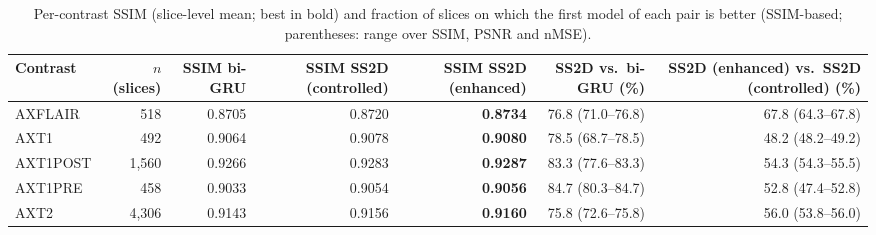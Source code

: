 \begin{table}[ht]
\centering
\caption{Per-contrast SSIM (slice-level mean; best in bold) and fraction of slices on which the first model of each pair is better (SSIM-based; parentheses: range over SSIM, PSNR and nMSE).}
\label{tab:contrast-slice}
\begin{tabular}{lrrrrrr}
\toprule
Contrast & $n$ (slices) & SSIM bi-GRU & SSIM SS2D (controlled) & SSIM SS2D (enhanced) & SS2D vs.\ bi-GRU (\%) & SS2D (enhanced) vs.\ SS2D (controlled) (\%) \\
\midrule
AXFLAIR & 518 & 0.8705 & 0.8720 & \textbf{0.8734} & 76.8 (71.0–76.8) & 67.8 (64.3–67.8) \\
AXT1 & 492 & 0.9064 & 0.9078 & \textbf{0.9080} & 78.5 (68.7–78.5) & 48.2 (48.2–49.2) \\
AXT1POST & 1{,}560 & 0.9266 & 0.9283 & \textbf{0.9287} & 83.3 (77.6–83.3) & 54.3 (54.3–55.5) \\
AXT1PRE & 458 & 0.9033 & 0.9054 & \textbf{0.9056} & 84.7 (80.3–84.7) & 52.8 (47.4–52.8) \\
AXT2 & 4{,}306 & 0.9143 & 0.9156 & \textbf{0.9160} & 75.8 (72.6–75.8) & 56.0 (53.8–56.0) \\
\bottomrule
\end{tabular}
\end{table}
